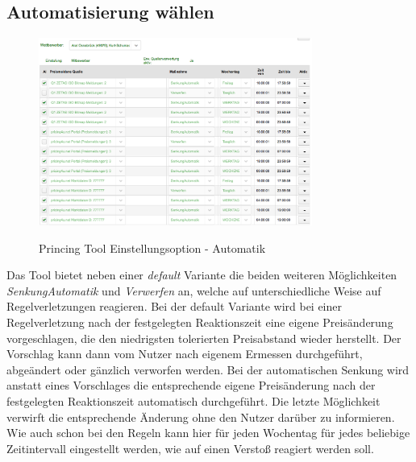 \subsection{Automatisierung wählen}
\begin{figure}[!ht]
	\center
	\includegraphics[width=0.8\textwidth]{Bilder/automatik.png}\\
	\caption{Princing Tool Einstellungsoption - Automatik}
	\label{fig:PTA}
\end{figure}                                                                          
Das Tool bietet neben einer \textit{default} Variante die beiden weiteren Möglichkeiten \textit{SenkungAutomatik} und \textit{Verwerfen} an, welche auf unterschiedliche Weise auf Regelverletzungen reagieren. Bei der default Variante wird bei einer Regelverletzung nach der festgelegten Reaktionszeit eine eigene Preisänderung vorgeschlagen, die den niedrigsten tolerierten Preisabstand wieder herstellt. Der Vorschlag kann dann vom Nutzer nach eigenem Ermessen durchgeführt, abgeändert oder gänzlich verworfen werden. Bei der automatischen Senkung wird anstatt eines Vorschlages die entsprechende eigene Preisänderung nach der festgelegten Reaktionszeit automatisch durchgeführt. Die letzte Möglichkeit verwirft die entsprechende Änderung ohne den Nutzer darüber zu informieren.  Wie auch schon bei den Regeln kann hier für jeden Wochentag für jedes beliebige Zeitintervall eingestellt werden, wie auf einen Verstoß reagiert werden soll.


